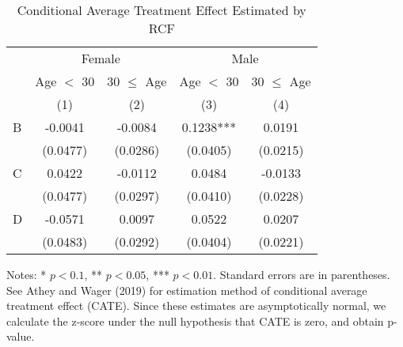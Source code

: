 \documentclass[12pt, a4paper]{article}
\begin{document}
\begin{table}

\caption{\label{tab:rcf-int-cate}Conditional Average Treatment Effect Estimated by RCF}
\centering
\fontsize{9}{11}\selectfont
\begin{threeparttable}
\begin{tabular}[t]{lcccc}
\toprule
\multicolumn{1}{c}{ } & \multicolumn{2}{c}{Female} & \multicolumn{2}{c}{Male} \\
\cmidrule(l{3pt}r{3pt}){2-3} \cmidrule(l{3pt}r{3pt}){4-5}
\multicolumn{1}{c}{ } & \multicolumn{1}{c}{Age $<$ 30} & \multicolumn{1}{c}{30 $\le$ Age} & \multicolumn{1}{c}{Age $<$ 30} & \multicolumn{1}{c}{30 $\le$ Age} \\
\cmidrule(l{3pt}r{3pt}){2-2} \cmidrule(l{3pt}r{3pt}){3-3} \cmidrule(l{3pt}r{3pt}){4-4} \cmidrule(l{3pt}r{3pt}){5-5}
 & (1) & (2) & (3) & (4)\\
\midrule
B & -0.0041 & -0.0084 & 0.1238*** & 0.0191\\
 & (0.0477) & (0.0286) & (0.0405) & (0.0215)\\
C & 0.0422 & -0.0112 & 0.0484 & -0.0133\\
 & (0.0477) & (0.0297) & (0.0410) & (0.0228)\\
D & -0.0571 & 0.0097 & 0.0522 & 0.0207\\
 & (0.0483) & (0.0292) & (0.0404) & (0.0221)\\
\bottomrule
\end{tabular}
\begin{tablenotes}
\item Notes: * $p < 0.1$, ** $p < 0.05$, *** $p < 0.01$. Standard errors are in parentheses. See Athey and Wager (2019) for estimation method of conditional average treatment effect (CATE). Since these estimates are asymptotically normal, we calculate the z-score under the null hypothesis that CATE is zero, and obtain p-value. 
\end{tablenotes}
\end{threeparttable}
\end{table}
\end{document}
